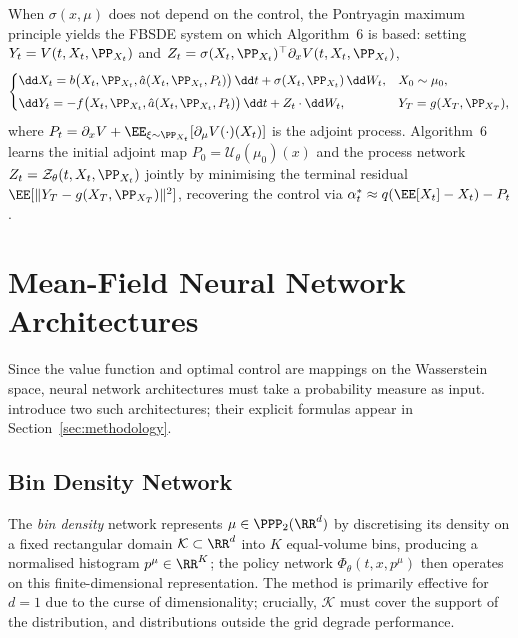 \documentclass[11pt]{article}
\begin{document}
When $\sigma(x,\mu)$ does not depend on the control, the Pontryagin maximum principle yields the FBSDE system on which Algorithm~6 is based: setting $Y_t = V(t,X_t,\PP_{X_t})$ and $Z_t = \sigma(X_t,\PP_{X_t})^\top\partial_x V(t,X_t,\PP_{X_t})$,
\begin{equation}\label{eq:fbsde}
  \begin{cases}
    \dd X_t = b\big(X_t, \PP_{X_t}, \hat{a}(X_t, \PP_{X_t}, P_t)\big)\,\dd t + \sigma(X_t, \PP_{X_t})\,\dd W_t, & X_0 \sim \mu_0, \\[4pt]
    \dd Y_t = -f\big(X_t, \PP_{X_t}, \hat{a}(X_t, \PP_{X_t}, P_t)\big)\,\dd t + Z_t \cdot \dd W_t, & Y_T = g(X_T, \PP_{X_T}),
  \end{cases}
\end{equation}
where $P_t = \partial_x V + \EE_{\xi \sim \PP_{X_t}}[\partial_\mu V(\cdot)(X_t)]$ is the adjoint process. Algorithm~6 learns the initial adjoint map $P_0 = \mathcal{U}_\theta(\mu_0)(x)$ and the process network $Z_t = \mathcal{Z}_\theta(t,X_t,\PP_{X_t})$ jointly by minimising the terminal residual $\EE[\|Y_T - g(X_T,\PP_{X_T})\|^2]$, recovering the control via $\alpha_t^* \approx q(\EE[X_t]-X_t) - P_t$.


\section{Mean-Field Neural Network Architectures}\label{sec:appendix-mfnn}

Since the value function and optimal control are mappings on the Wasserstein space, neural network architectures must take a probability measure as input. \citet{pham2024mfnn} introduce two such architectures; their explicit formulas appear in Section~\ref{sec:methodology}.

\subsection{Bin Density Network}

The \emph{bin density} network represents $\mu \in \PPP_2(\RR^d)$ by discretising its density on a fixed rectangular domain $\mathcal{K} \subset \RR^d$ into $K$ equal-volume bins, producing a normalised histogram $p^\mu \in \RR^K$; the policy network $\Phi_\theta(t, x, p^\mu)$ then operates on this finite-dimensional representation. The method is primarily effective for $d = 1$ due to the curse of dimensionality; crucially, $\mathcal{K}$ must cover the support of the distribution, and distributions outside the grid degrade performance.
\end{document}
